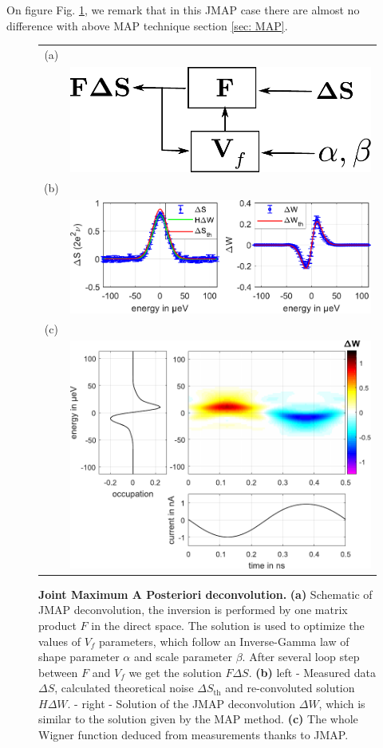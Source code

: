On figure Fig. \ref{fig: JMAP deconvolution}, we remark that in this JMAP case there are almost no difference with above MAP technique section \ref{sec: MAP}.

\begin{figure}[hptb]
	\begin{center}
		\begin{tabular}{c c}
			(a) &  \\ 
			
			& \includegraphics[width = 4 cm]{./appA/JMAP_deconvolution} \\ 
			
			(b) &  \\ 
			
			& \includegraphics[width = 10 cm]{./appA/JMAP_result} \\
			
			(c) &  \\ 
			
			& \includegraphics[width = 10 cm]{./appA/JMAP_wigner}
		\end{tabular} 
	\end{center}
	
	\caption{\textbf{Joint Maximum A Posteriori deconvolution.} \textbf{(a)} Schematic of JMAP deconvolution, the inversion is performed by one matrix product $F$ in the direct space. The solution is used to optimize the values of $V_{f}$ parameters, which follow an Inverse-Gamma law of shape parameter $\alpha$ and scale parameter $\beta$. After several loop step between $F$ and $V_{f}$ we get the solution $F\Delta S$. \textbf{(b)} left - Measured data $\Delta S$, calculated theoretical noise $\Delta S_{\mathrm{th}}$ and re-convoluted solution $H\Delta W$. - right - Solution of the JMAP deconvolution $\Delta W$, which is similar to the solution given by the MAP method. \textbf{(c)} The whole Wigner function deduced from measurements thanks to JMAP.}
	\label{fig: JMAP deconvolution}
\end{figure}


